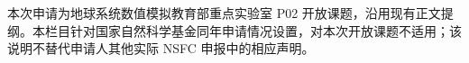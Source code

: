 \justifying
\NSFCBodyText

本次申请为地球系统数值模拟教育部重点实验室 P02 开放课题，沿用现有正文提纲。本栏目针对国家自然科学基金同年申请情况设置，对本次开放课题不适用；该说明不替代申请人其他实际 NSFC 申报中的相应声明。

